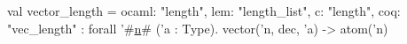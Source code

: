 val vector_length = {
  ocaml: "length",
  lem: "length_list",
  c: "length",
  coq: "vec_length"
} : forall '#\hyperref[zn]{n}# ('a : Type). vector('n, dec, 'a) -> atom('n)
